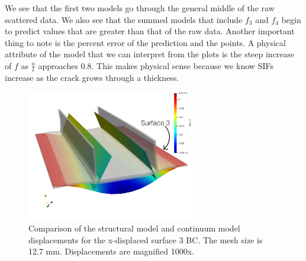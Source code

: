 We see that the first two models go through the general middle of the raw
scattered data. We also see that the summed models that include $f_3$ and $f_4$
begin to predict values that are greater than that of the raw data. Another
important thing to note is the percent error of the prediction and the points. A
physical attribute of the model that we can interpret from the plots is the
steep increase of $f$ as $\frac{a}{t}$ approaches 0.8. This makes physical sense
because we know SIFs increase as the crack grows through a thickness.
\newpage
\begin{figure}
\centering
\includegraphics[width=0.65\textwidth,height=\textwidth,keepaspectratio]{2d_mesh_converge_coarse.png}
\caption{Comparison of the structural model and continuum model displacements for the x-displaced surface 3 BC. The mesh size is 12.7 mm. Displacements are magnified 1000x.
}
\label{fig:2d_mesh_converge_coarse}
\end{figure}

